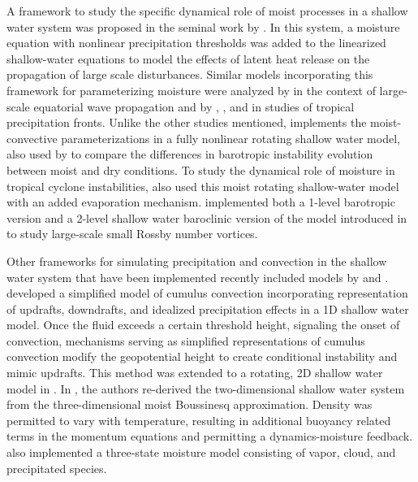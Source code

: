 A framework to study the specific dynamical role of moist processes in a shallow water system
was proposed in the seminal work by \cite{gill1982studies}. In this system,
 a moisture equation with nonlinear precipitation thresholds was added to the 
linearized shallow-water equations to model the effects of latent heat release on the 
propagation of large scale disturbances. Similar models incorporating this framework for 
parameterizing moisture were analyzed by \cite{goswami1991modification} in the context of
large-scale equatorial wave propagation and by \cite{frierson2004large},
\cite{stechmann2006structure}, and \cite{bouchut2009fronts} in studies of tropical precipitation 
fronts. Unlike the other studies mentioned, \cite{bouchut2009fronts} implements the moist-convective 
parameterizations in a fully nonlinear rotating shallow water model,
also used by \cite{lambaerts2011moist} to compare the differences in barotropic instability evolution between moist and dry conditions. To study the
dynamical role of moisture in tropical cyclone instabilities, \cite{lahaye2016understanding} 
also used this moist rotating shallow-water model with an added evaporation 
mechanism. \cite{rostami2017influence} implemented both a 1-level barotropic 
version and a 2-level shallow water baroclinic version of the model introduced in 
\cite{lambaerts2011moist} to study large-scale small Rossby number vortices.

Other frameworks for simulating precipitation and convection in the shallow water
system that have been implemented recently included models by 
\cite{wursch2014simple} and \cite{zerroukat2015moist}.
\cite{wursch2014simple} developed a simplified model of cumulus convection 
incorporating representation of updrafts, downdrafts, and idealized precipitation 
effects in a 1D shallow water model. 
Once the fluid exceeds a certain threshold height, signaling the 
onset of convection, mechanisms serving as simplified representations 
of cumulus convection modify the geopotential height to create
conditional instability and mimic updrafts. 
This method was extended to a rotating, 2D shallow 
water model in \cite{kent2017dynamics}.
In \cite{zerroukat2015moist}, the authors re-derived the two-dimensional
shallow water system from the three-dimensional moist Boussinesq 
approximation. Density was permitted to vary with temperature,
resulting in additional buoyancy related terms in the momentum equations and
permitting a dynamics-moisture feedback. \cite{zerroukat2015moist} also 
implemented a three-state moisture model consisting of vapor, cloud, and 
precipitated species.

